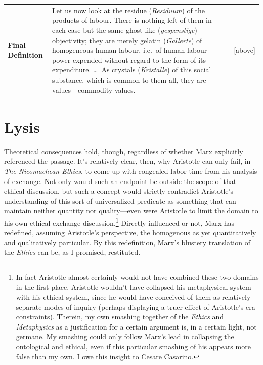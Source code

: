 \documentclass[12pt]{article}
\begin{document}
\begin{singlespacing}
\begin{table}[htbp]
\begin{tabularx}{\textwidth}{l|X|X}
\hline
\textbf{Final Definition} & Let us now look at the residue (\textit{Residuum}) of the products of labour. There is nothing left of them in each case but the same ghost-like (\textit{gespenstige}) objectivity; they are merely gelatin (\textit{Gallerte}) of homogeneous human labour, i.e.\ of human labour-power expended without regard to the form of its expenditure. \dots\ As crystals (\textit{Kristalle}) of this social substance, which is common to them all, they are values---commodity values. & [above] \\
\end{tabularx}
\end{table}
\end{singlespacing}

\newpage
\section{Lysis}
Theoretical consequences hold, though, regardless of whether Marx explicitly referenced the passage. It's relatively clear, then, why Aristotle can only fail, in \textit{The Nicomachean Ethics}, to come up with congealed labor-time from his analysis of exchange. Not only would such an endpoint be outside the scope of that ethical discussion, but such a concept would strictly contradict Aristotle's understanding of this sort of universalized predicate as something that can maintain neither quantity nor quality---even were Aristotle to limit the domain to his own ethical-exchange discussion.\footnote{In fact Aristotle almost certainly would not have combined these two domains in the first place. Aristotle wouldn't have collapsed his metaphysical system with his ethical system, since he would have conceived of them as relatively separate modes of inquiry (perhaps displaying a truer effect of Aristotle's era constraints). Therein, my own smashing together of the \textit{Ethics} and \textit{Metaphysics} as a justification for a certain argument is, in a certain light, not germane. My smashing could only follow Marx's lead in collapsing the ontological and ethical, even if this particular smashing of his appears more false than my own. I owe this insight to Cesare Casarino.} Directly influenced or not, Marx has redefined, assuming Aristotle's perspective, the homogenous as yet quantitatively and qualitatively particular. By this redefinition, Marx's blustery translation of the \textit{Ethics} can be, as I promised, restituted.  
\end{document}
